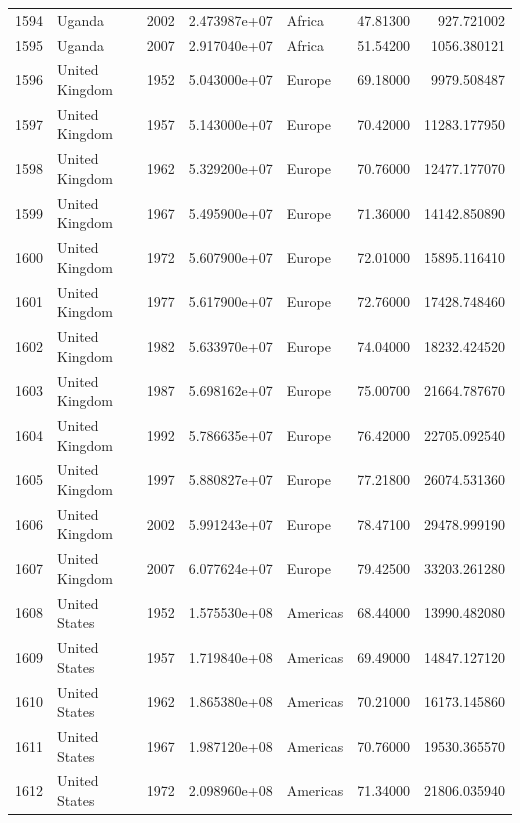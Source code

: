 \documentclass[
  letterpaper,
  DIV=11,
  numbers=noendperiod]{scrreprt}
\begin{document}
\begin{tabular}{llrrlrr}
1594 &                    Uganda &  2002 &  2.473987e+07 &    Africa &  47.81300 &     927.721002 \\
1595 &                    Uganda &  2007 &  2.917040e+07 &    Africa &  51.54200 &    1056.380121 \\
1596 &            United Kingdom &  1952 &  5.043000e+07 &    Europe &  69.18000 &    9979.508487 \\
1597 &            United Kingdom &  1957 &  5.143000e+07 &    Europe &  70.42000 &   11283.177950 \\
1598 &            United Kingdom &  1962 &  5.329200e+07 &    Europe &  70.76000 &   12477.177070 \\
1599 &            United Kingdom &  1967 &  5.495900e+07 &    Europe &  71.36000 &   14142.850890 \\
1600 &            United Kingdom &  1972 &  5.607900e+07 &    Europe &  72.01000 &   15895.116410 \\
1601 &            United Kingdom &  1977 &  5.617900e+07 &    Europe &  72.76000 &   17428.748460 \\
1602 &            United Kingdom &  1982 &  5.633970e+07 &    Europe &  74.04000 &   18232.424520 \\
1603 &            United Kingdom &  1987 &  5.698162e+07 &    Europe &  75.00700 &   21664.787670 \\
1604 &            United Kingdom &  1992 &  5.786635e+07 &    Europe &  76.42000 &   22705.092540 \\
1605 &            United Kingdom &  1997 &  5.880827e+07 &    Europe &  77.21800 &   26074.531360 \\
1606 &            United Kingdom &  2002 &  5.991243e+07 &    Europe &  78.47100 &   29478.999190 \\
1607 &            United Kingdom &  2007 &  6.077624e+07 &    Europe &  79.42500 &   33203.261280 \\
1608 &             United States &  1952 &  1.575530e+08 &  Americas &  68.44000 &   13990.482080 \\
1609 &             United States &  1957 &  1.719840e+08 &  Americas &  69.49000 &   14847.127120 \\
1610 &             United States &  1962 &  1.865380e+08 &  Americas &  70.21000 &   16173.145860 \\
1611 &             United States &  1967 &  1.987120e+08 &  Americas &  70.76000 &   19530.365570 \\
1612 &             United States &  1972 &  2.098960e+08 &  Americas &  71.34000 &   21806.035940 \\

\end{tabular}
\end{document}
